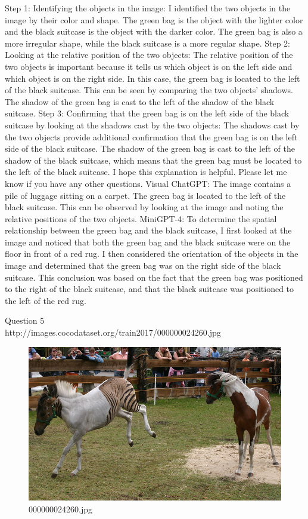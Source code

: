 \begin{enumerate}
        Step 1: Identifying the objects in the image: I identified the two objects in the image by their color and shape. The green bag is the object with the lighter color and the black suitcase is the object with the darker color. The green bag is also a more irregular shape, while the black suitcase is a more regular shape.
        Step 2: Looking at the relative position of the two objects: The relative position of the two objects is important because it tells us which object is on the left side and which object is on the right side. In this case, the green bag is located to the left of the black suitcase. This can be seen by comparing the two objects' shadows. The shadow of the green bag is cast to the left of the shadow of the black suitcase.
        Step 3: Confirming that the green bag is on the left side of the black suitcase by looking at the shadows cast by the two objects: The shadows cast by the two objects provide additional confirmation that the green bag is on the left side of the black suitcase. The shadow of the green bag is cast to the left of the shadow of the black suitcase, which means that the green bag must be located to the left of the black suitcase.
        I hope this explanation is helpful. Please let me know if you have any other questions.
        \subitem Visual ChatGPT: The image contains a pile of luggage sitting on a carpet. The green bag is located to the left of the black suitcase. This can be observed by looking at the image and noting the relative positions of the two objects.
        \subitem MiniGPT-4: To determine the spatial relationship between the green bag and the black suitcase, I first looked at the image and noticed that both the green bag and the black suitcase were on the floor in front of a red rug. I then considered the orientation of the objects in the image and determined that the green bag was on the right side of the black suitcase. This conclusion was based on the fact that the green bag was positioned to the right of the black suitcase, and that the black suitcase was positioned to the left of the red rug.
    \end{enumerate}
Question 5\\
http://images.cocodataset.org/train2017/000000024260.jpg
    \begin{figure}[h]
        \centering
        \includegraphics[width=0.8\linewidth]{../image set/easy/000000024260.jpg}
        \caption{000000024260.jpg}
    \end{figure}
